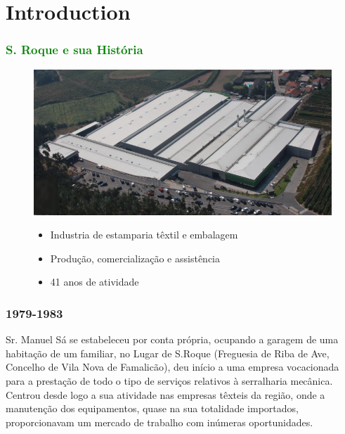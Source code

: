 \section{Introduction}
\begin{frame}
\frametitle{\textcolor{green}{S. Roque e sua História}}

\begin{figure}[H]

\begin{minipage}{0.45\linewidth}
\includegraphics[scale=0.25]{./image/ROQ/ROQ_Pavilhoes.jpg}
\end{minipage}
\hfill
\begin{minipage}{0.45\linewidth}
\begin{itemize}
\item Industria de estamparia têxtil e embalagem\\
\item Produção, comercialização e assistência\\
\item 41 anos de atividade
\end{itemize}
\end{minipage}

\end{figure}

\end{frame}
\begin{frame}
\frametitle{1979-1983}
Sr. Manuel Sá se estabeleceu por conta própria, ocupando a garagem de uma habitação de um familiar, no Lugar de S.Roque (Freguesia de Riba de Ave, Concelho de Vila Nova de Famalicão), deu início a uma empresa vocacionada para a prestação de todo o tipo de serviços relativos à serralharia mecânica. Centrou desde logo a sua atividade nas empresas têxteis da região, onde a manutenção dos equipamentos, quase na sua totalidade importados, proporcionavam um mercado de trabalho com inúmeras oportunidades.
\end{frame}
